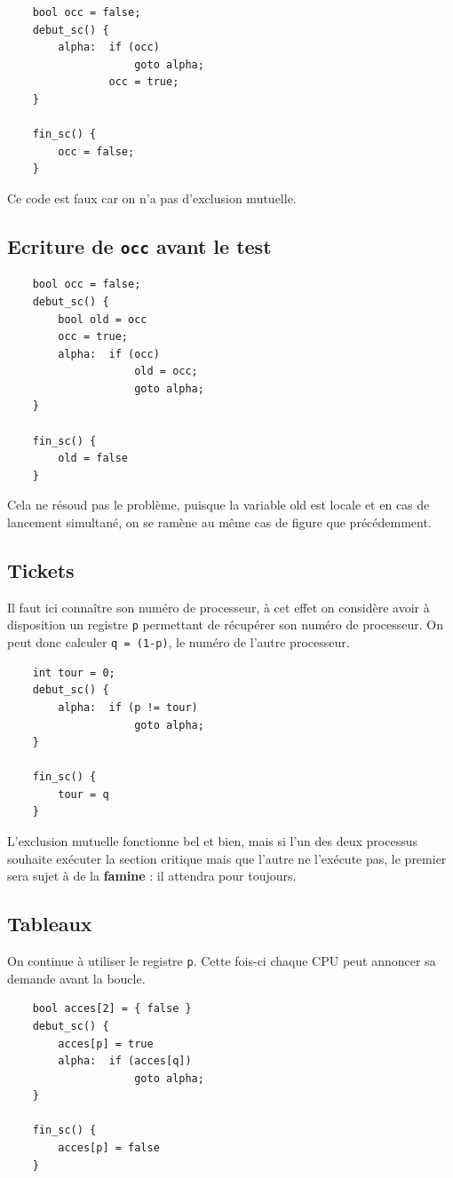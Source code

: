 \documentclass[11pt]{article}
\begin{document}
\begin{verbatim}
    bool occ = false;
    debut_sc() {
        alpha:  if (occ)
                    goto alpha;
                occ = true;
    }

    fin_sc() {
        occ = false;
    }
\end{verbatim}

Ce code est faux car on n'a pas d'exclusion mutuelle.

\subsection{Ecriture de \texttt{occ} avant le test}
\begin{verbatim}
    bool occ = false;
    debut_sc() {
        bool old = occ
        occ = true;
        alpha:  if (occ)
                    old = occ;
                    goto alpha;
    }

    fin_sc() {
        old = false
    }
\end{verbatim}

Cela ne résoud pas le problème, puisque la variable old est locale et en cas de lancement simultané, on se ramène au même cas de figure que précédemment.

\subsection{Tickets}

Il faut ici connaître son numéro de processeur, à cet effet on considère avoir à disposition un registre \texttt{p} permettant de récupérer son numéro de processeur. On peut donc calculer \texttt{q = (1-p)}, le numéro de l'autre processeur.
\begin{verbatim}
    int tour = 0;
    debut_sc() {
        alpha:  if (p != tour)
                    goto alpha;
    }

    fin_sc() {
        tour = q
    }
\end{verbatim}

L'exclusion mutuelle fonctionne bel et bien, mais si l'un des deux processus souhaite exécuter la section critique mais que l'autre ne l'exécute pas, le premier sera sujet à de la \textbf{famine} : il attendra pour toujours.

\subsection{Tableaux}
On continue à utiliser le registre \texttt{p}. Cette fois-ci chaque CPU peut annoncer sa demande avant la boucle.
\begin{verbatim}
    bool acces[2] = { false }
    debut_sc() {
        acces[p] = true
        alpha:  if (acces[q])
                    goto alpha;
    }

    fin_sc() {
        acces[p] = false
    }
\end{verbatim}
\end{document}
